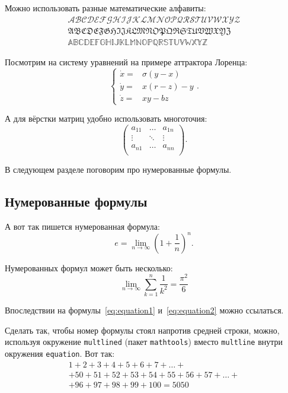 \documentclass[12pt]{extarticle}
\begin{document}
Можно использовать разные математические алфавиты:
\[\begin{aligned}
    \mathcal{ABCDEFGHIJKLMNOPQRSTUVWXYZ} \nonumber  \\
    \mathfrak{ABCDEFGHIJKLMNOPQRSTUVWXYZ} \nonumber \\
    \mathbb{ABCDEFGHIJKLMNOPQRSTUVWXYZ} \nonumber
\end{aligned}\]

Посмотрим на систему уравнений на примере аттрактора Лоренца:
\[\left\{
\begin{array}{rl}
    \dot x = & \sigma (y-x)  \\
    \dot y = & x (r - z) - y \\
    \dot z = & xy - bz
\end{array}\right..\]

А для вёрстки матриц удобно использовать многоточия:
\[\left(\begin{array}{ccc}
a_{11} & \ldots & a_{1n} \\
\vdots & \ddots & \vdots \\
a_{n1} & \ldots & a_{nn} \\
\end{array} \right).\]

В следующем разделе поговорим про нумерованные формулы.
\subsection{Нумерованные формулы}
\label{subsec:ch1/sec3/sub3}
А вот так пишется нумерованная формула:
\begin{equation}
\label{eq:equation1}
 e = \lim_{n \to \infty} \left( 1+\frac{1}{n} \right)^n.
\end{equation}

Нумерованных формул может быть несколько:
\begin{equation}
\label{eq:equation2}
\lim_{n \to \infty} \sum_{k=1}^n \frac{1}{k^2} = \frac{\pi^2}{6}
\end{equation}

Впоследствии на формулы~\eqref{eq:equation1} и~\eqref{eq:equation2} можно ссылаться.

Сделать так, чтобы номер формулы стоял напротив средней строки, можно, используя окружение \texttt{multlined} (пакет \texttt{mathtools}) вместо \texttt{multline} внутри окружения \texttt{equation}. Вот так:
\begin{equation}
\label{eq:equation3}
\begin{multlined}
        1+ 2+3+4+5+6+7+\dots + \\
        + 50+51+52+53+54+55+56+57 + \dots + \\
        + 96+97+98+99+100=5050
\end{multlined}
\end{equation}
\end{document}
